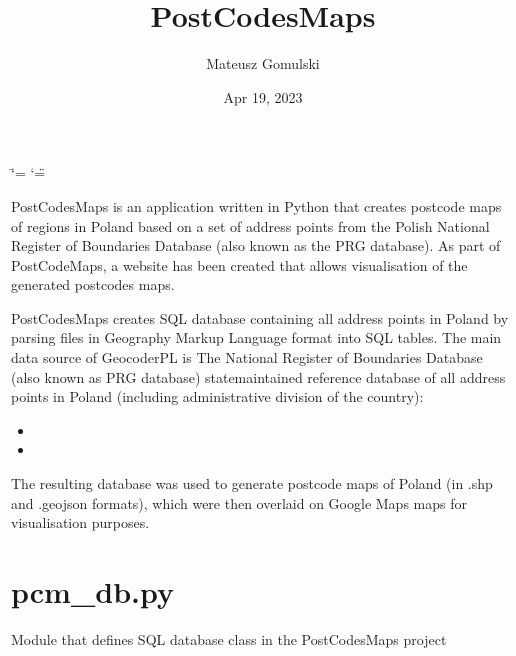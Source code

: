 \documentclass[letterpaper,10pt,english]{sphinxmanual}
\title{PostCodesMaps}
\date{Apr 19, 2023}
\author{Mateusz Gomulski}
\begin{document}
\ifdefined\shorthandoff
  \ifnum\catcode`\=\string=\active\shorthandoff{=}\fi
  \ifnum\catcode`\"=\active{}\fi
\fi

\pagestyle{empty}
\sphinxmaketitle
\pagestyle{plain}
\sphinxtableofcontents
\pagestyle{normal}
\label{\detokenize{index::doc}}


\sphinxAtStartPar
PostCodesMaps is an application written in Python that creates postcode maps of regions in Poland based on a set of address points from the Polish National Register of Boundaries Database (also known as the PRG database). As part of PostCodeMaps, a website has been created that allows visualisation of the generated postcodes maps.

\sphinxAtStartPar
PostCodesMaps creates SQL database containing all address points in Poland by parsing files in Geography Markup Language format into SQL tables. The main data source of GeocoderPL is The National Register of Boundaries Database (also known as PRG database) \sphinxhyphen{} state\sphinxhyphen{}maintained reference database of all address points in Poland (including administrative division of the country):
\begin{itemize}
\item {} 
\sphinxAtStartPar
{}

\item {} 
\sphinxAtStartPar
{}

\end{itemize}

\sphinxAtStartPar
The resulting database was used to generate postcode maps of Poland (in .shp and .geojson formats), which were then overlaid on Google Maps maps for visualisation purposes.

\sphinxstepscope


\chapter{pcm\_db.py}
\label{\detokenize{pcm_db:module-pcm_db}}\label{\detokenize{pcm_db:pcm-db-py}}\label{\detokenize{pcm_db::doc}}
\sphinxAtStartPar
Module that defines SQL database class in the PostCodesMaps project
\end{document}
